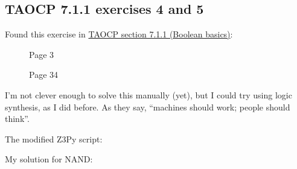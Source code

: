 \subsection{TAOCP 7.1.1 exercises 4 and 5}

Found this exercise in \href{http://www.cs.utsa.edu/~wagner/knuth/fasc0b.pdf}{TAOCP section 7.1.1 (Boolean basics)}:

\begin{figure}[H]
\centering
{}
\caption{Page 3}
\end{figure}

\begin{figure}[H]
\centering
{}
\caption{Page 34}
\end{figure}

I'm not clever enough to solve this manually (yet),
but I could try using logic synthesis, as I did before.
As they say, ``machines should work; people should think''.

The modified Z3Py script:



My solution for NAND:

